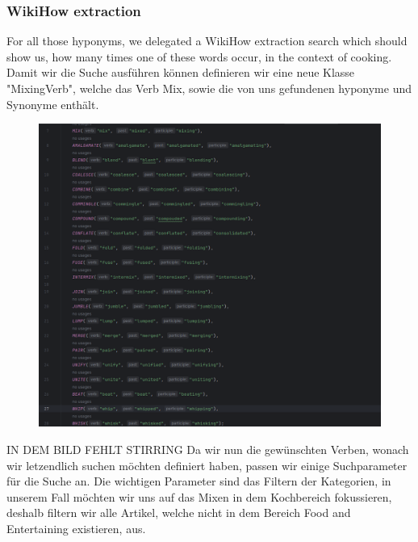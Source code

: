   \subsubsection*{WikiHow extraction}
  For all those hyponyms, we delegated a WikiHow extraction search which should show us, how many times one of these words occur, in the context of cooking.
	Damit wir die Suche ausführen können definieren wir eine neue Klasse "MixingVerb", welche das Verb Mix, sowie die von uns gefundenen hyponyme und Synonyme enthält.
  \begin{figure}[H]
    \includegraphics[scale=0.3]{Graphics/MixingVerbClass.png}
    \end{figure}
    IN DEM BILD FEHLT STIRRING
  Da wir nun die gewünschten Verben, wonach wir letzendlich suchen möchten definiert haben, passen wir einige Suchparameter für die Suche an.
  Die wichtigen Parameter sind das Filtern der Kategorien, in unserem Fall möchten wir uns auf das Mixen in dem Kochbereich fokussieren, deshalb filtern wir alle Artikel, welche nicht in dem Bereich Food and Entertaining existieren, aus.

